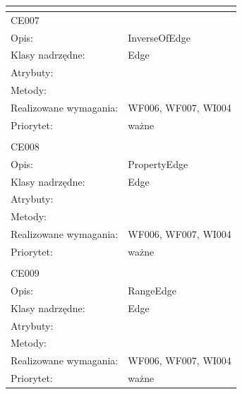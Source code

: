 \documentclass[a4paper,10pt]{article}
\begin{document}
\begin{center}
\begin{longtable}{|m{3cm}|m{9cm}|}
\multicolumn{2}{c}{} \\
 \hline

CE007 &  \\ \hline
Opis: & InverseOfEdge    \\ \hline
Klasy nadrzędne: & Edge    \\ \hline
Atrybuty: & %
 \\ \hline
Metody: & %
  \\ \hline
Realizowane wymagania: & WF006, WF007, WI004 \\ \hline
Priorytet: & ważne  \\ \hline

\multicolumn{2}{c}{} \\
 \hline

CE008 &  \\ \hline
Opis: & PropertyEdge    \\ \hline
Klasy nadrzędne: & Edge    \\ \hline
Atrybuty: & %
 \\ \hline
Metody: & %
  \\ \hline
Realizowane wymagania: & WF006, WF007, WI004 \\ \hline
Priorytet: & ważne  \\ \hline

\multicolumn{2}{c}{} \\
 \hline

CE009 &  \\ \hline
Opis: & RangeEdge    \\ \hline
Klasy nadrzędne: & Edge    \\ \hline
Atrybuty: & %
 \\ \hline
Metody: & %
  \\ \hline
Realizowane wymagania: & WF006, WF007, WI004 \\ \hline
Priorytet: & ważne  \\ \hline


\end{longtable}
\end{center}
\end{document}
